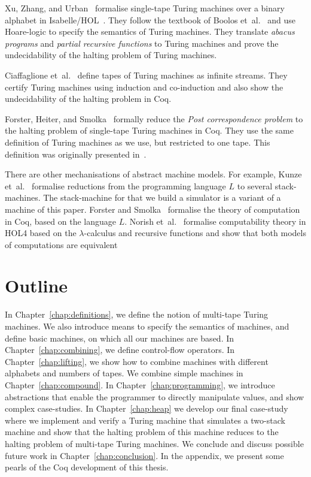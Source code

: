 Xu, Zhang, and Urban~\cite{Xu:2013:MTM:2529315.2529331} formalise single-tape Turing machines over a binary alphabet in
Isabelle/HOL~\cite{nipkow2002isabelle}.  They follow the textbook of Boolos et~al.~\cite{boolos2007computability} and use Hoare-logic to specify the
semantics of Turing machines.  They translate \textit{abacus programs} and \textit{partial recursive functions} to Turing machines and prove the
undecidability of the halting problem of Turing machines.

Ciaffaglione et~al.~\cite{Ciaffaglione:2016:TTC:2956213.2956306} define tapes of Turing machines as infinite streams.  They certify Turing machines
using induction and co-induction and also show the undecidability of the halting problem in Coq.

Forster, Heiter, and Smolka~\cite{PCPITP} formally reduce the \textit{Post correspondence problem} to the halting problem of single-tape Turing
machines in Coq.  They use the same definition of Turing machines as we use, but restricted to one tape.  This definition was originally presented
in~\cite{asperti2012}.

There are other mechanisations of abstract machine models.  For example, Kunze et~al.~\cite{KunzeEtAl:2018:Formal} formalise reductions from the
programming language $L$ to several stack-machines.  The stack-machine for that we build a simulator is a variant of a machine of this paper.  Forster
and Smolka~\cite{ForsterSmolka17} formalise the theory of computation in Coq, based on the language $L$.  Norish
et~al.~\cite{NorrishComputabilityTheory} formalise computability theory in HOL4 based on the $\lambda$-calculus and recursive functions and show that
both models of computations are equivalent



\section{Outline}
\label{sec:outline}

In Chapter~\ref{chap:definitions}, we define the notion of multi-tape Turing machines.  We also introduce means to specify the semantics of machines,
and define basic machines, on which all our machines are based.  In Chapter~\ref{chap:combining}, we define control-flow operators.  In
Chapter~\ref{chap:lifting}, we show how to combine machines with different alphabets and numbers of tapes.  We combine simple machines in
Chapter~\ref{chap:compound}.  In Chapter~\ref{chap:programming}, we introduce abstractions that enable the programmer to directly manipulate values,
and show complex case-studies.  In Chapter~\ref{chap:heap} we develop our final case-study where we implement and verify a Turing machine that
simulates a two-stack machine and show that the halting problem of this machine reduces to the halting problem of multi-tape Turing machines.  We
conclude and discuss possible future work in Chapter~\ref{chap:conclusion}.  In the appendix, we present some pearls of the Coq development of this
thesis.

